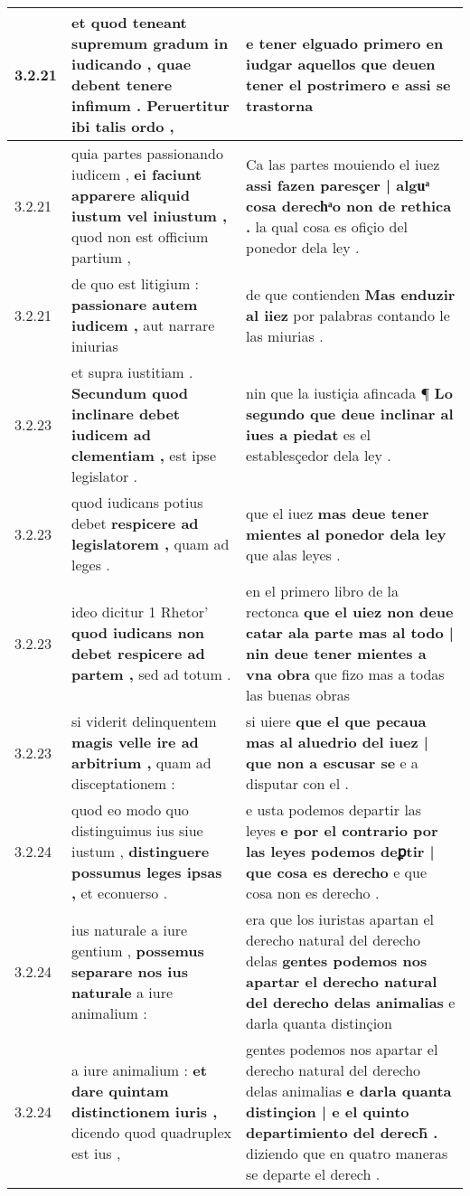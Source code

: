 \begin{tabular}{|p{1cm}|p{6.5cm}|p{6.5cm}|}
3.2.21 & et quod teneant supremum gradum in iudicando , \textbf{ quae debent tenere infimum . } Peruertitur ibi talis ordo , & e tener elguado primero en iudgar \textbf{ aquellos que deuen tener el postrimero } e assi se trastorna \\\hline
3.2.21 & quia partes passionando iudicem , \textbf{ ei faciunt apparere aliquid iustum vel iniustum , } quod non est officium partium , & Ca las partes mouiendo el iuez \textbf{ assi fazen paresçer | alguͣ cosa derechͣo non de rethica . } la qual cosa es ofiçio del ponedor dela ley . \\\hline
3.2.21 & de quo est litigium : \textbf{ passionare autem iudicem , } aut narrare iniurias & de que contienden \textbf{ Mas enduzir al iiez } por palabras contando le las miurias . \\\hline
3.2.23 & et supra iustitiam . \textbf{ Secundum quod inclinare debet iudicem ad clementiam , } est ipse legislator . & nin que la iustiçia afincada ¶ \textbf{ Lo segundo que deue inclinar al iues a piedat } es el establesçedor dela ley . \\\hline
3.2.23 & quod iudicans potius debet \textbf{ respicere ad legislatorem , } quam ad leges . & que el iuez \textbf{ mas deue tener mientes al ponedor dela ley } que alas leyes . \\\hline
3.2.23 & ideo dicitur 1 Rhetor’ \textbf{ quod iudicans non debet respicere ad partem , } sed ad totum . & en el primero libro de la rectonca \textbf{ que el uiez non deue catar ala parte mas al todo | nin deue tener mientes a vna obra } que fizo mas a todas las buenas obras \\\hline
3.2.23 & si viderit delinquentem \textbf{ magis velle ire ad arbitrium , } quam ad disceptationem : & si uiere \textbf{ que el que pecaua mas al aluedrio del iuez | que non a escusar se } e a disputar con el . \\\hline
3.2.24 & quod eo modo quo distinguimus ius siue iustum , \textbf{ distinguere possumus leges ipsas , } et econuerso . & e usta podemos departir las leyes \textbf{ e por el contrario por las leyes podemos deꝑtir | que cosa es derecho } e que cosa non es derecho . \\\hline
3.2.24 & ius naturale a iure gentium , \textbf{ possemus separare nos ius naturale } a iure animalium : & era que los iuristas apartan el derecho natural del derecho delas \textbf{ gentes podemos nos apartar el derecho natural del derecho delas animalias } e darla quanta distinçion \\\hline
3.2.24 & a iure animalium : \textbf{ et dare quintam distinctionem iuris , } dicendo quod quadruplex est ius , & gentes podemos nos apartar el derecho natural del derecho delas animalias \textbf{ e darla quanta distinçion | e el quinto departimiento del derech̃ . } diziendo que en quatro maneras se departe el derech . \\\hline

\end{tabular}

